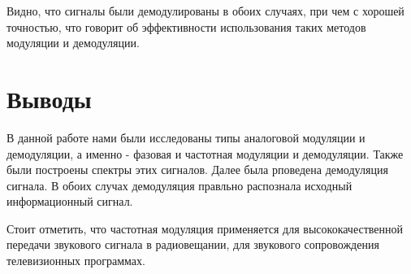 Видно, что сигналы были демодулированы в обоих случаях, при чем с хорошей точностью, что говорит об эффективности использования таких методов модуляции и демодуляции.

\section{Выводы}

В данной работе нами были исследованы типы аналоговой модуляции и демодуляции, а именно - фазовая и частотная модуляции и демодуляции. Также были построены спектры этих сигналов. Далее была рповедена демодуляция сигнала. В обоих случах демодуляция правльно распознала исходный информационный сигнал.

Стоит отметить, что частотная модуляция применяется для высококачественной передачи звукового сигнала в радиовещании, для звукового сопровождения телевизионных программах.

